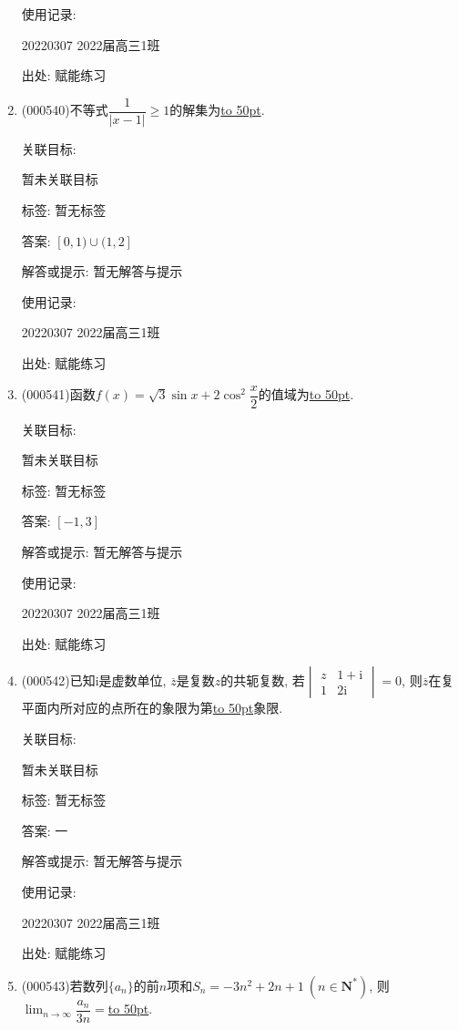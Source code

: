 \documentclass[10pt,a4paper]{article}
\newcommand{\blank}[1]{\underline{\hbox to #1pt{}}}
\begin{document}
\begin{enumerate}[1.]
使用记录:

20220307	2022届高三1班	


出处: 赋能练习
\item { (000540)}不等式$\dfrac1{|x-1|}\ge 1 $的解集为\blank{50}.


关联目标:

暂未关联目标



标签: 暂无标签

答案: $[0,1)\cup (1,2]$

解答或提示: 暂无解答与提示

使用记录:

20220307	2022届高三1班	


出处: 赋能练习
\item { (000541)}函数$f(x)=\sqrt 3\sin x+2\cos^2\dfrac x2$的值域为\blank{50}.


关联目标:

暂未关联目标



标签: 暂无标签

答案: $[-1,3]$

解答或提示: 暂无解答与提示

使用记录:

20220307	2022届高三1班	


出处: 赋能练习
\item { (000542)}已知$\mathrm{i}$是虚数单位, $\overline z$是复数$z$的共轭复数, 若$\begin{vmatrix} z & 1+\mathrm{i}  \\ 1 & 2\mathrm{i} \end{vmatrix}=0$, 则$\overline z$在复平面内所对应的点所在的象限为第\blank{50}象限.


关联目标:

暂未关联目标



标签: 暂无标签

答案: 一

解答或提示: 暂无解答与提示

使用记录:

20220307	2022届高三1班	


出处: 赋能练习
\item { (000543)}若数列$\{a_n\}$的前$n$项和$S_n=-3n^2+2n+1 \ (n\in \mathbf{N}^*)$, 则$\displaystyle\lim_{n\to\infty}\dfrac{a_n}{3n}=$\blank{50}.



\end{enumerate}
\end{document}
